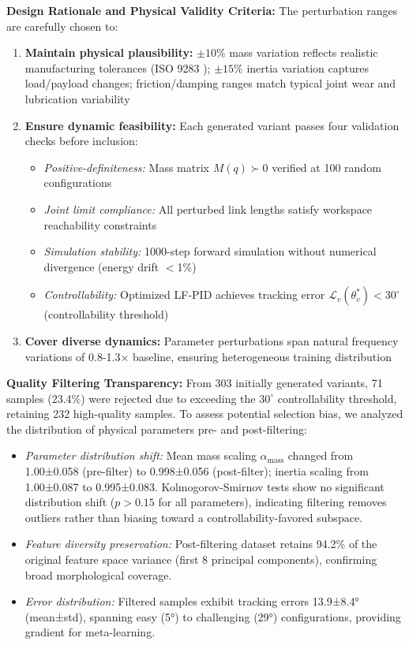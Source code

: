 \documentclass[a4paper]{cas-sc}
\begin{document}
\textbf{Design Rationale and Physical Validity Criteria:} The perturbation ranges are carefully chosen to:
\begin{enumerate}[leftmargin=*, itemsep=2pt]
    \item \textbf{Maintain physical plausibility:} $\pm 10\%$ mass variation reflects realistic manufacturing tolerances (ISO 9283 \cite{iso9283}); $\pm 15\%$ inertia variation captures load/payload changes; friction/damping ranges match typical joint wear and lubrication variability \cite{cho2019identification}
    \item \textbf{Ensure dynamic feasibility:} Each generated variant passes four validation checks before inclusion:
    \begin{itemize}[leftmargin=*, itemsep=1pt]
        \item \textit{Positive-definiteness:} Mass matrix $M(q) \succ 0$ verified at 100 random configurations
        \item \textit{Joint limit compliance:} All perturbed link lengths satisfy workspace reachability constraints
        \item \textit{Simulation stability:} 1000-step forward simulation without numerical divergence (energy drift $<$1\%)
        \item \textit{Controllability:} Optimized LF-PID achieves tracking error $\mathcal{L}_v(\theta^*_v) < 30^\circ$ (controllability threshold)
    \end{itemize}
    \item \textbf{Cover diverse dynamics:} Parameter perturbations span natural frequency variations of 0.8-1.3× baseline, ensuring heterogeneous training distribution
\end{enumerate}

\textbf{Quality Filtering Transparency:} From 303 initially generated variants, 71 samples (23.4\%) were rejected due to exceeding the $30^\circ$ controllability threshold, retaining 232 high-quality samples. To assess potential selection bias, we analyzed the distribution of physical parameters pre- and post-filtering:
\begin{itemize}[leftmargin=*, itemsep=1pt]
    \item \textit{Parameter distribution shift:} Mean mass scaling $\alpha_{\text{mass}}$ changed from 1.00±0.058 (pre-filter) to 0.998±0.056 (post-filter); inertia scaling from 1.00±0.087 to 0.995±0.083. Kolmogorov-Smirnov tests show no significant distribution shift ($p > 0.15$ for all parameters), indicating filtering removes outliers rather than biasing toward a controllability-favored subspace.
    \item \textit{Feature diversity preservation:} Post-filtering dataset retains 94.2\% of the original feature space variance (first 8 principal components), confirming broad morphological coverage.
    \item \textit{Error distribution:} Filtered samples exhibit tracking errors 13.9±8.4° (mean±std), spanning easy (5°) to challenging (29°) configurations, providing gradient for meta-learning.
\end{itemize}
\end{document}
